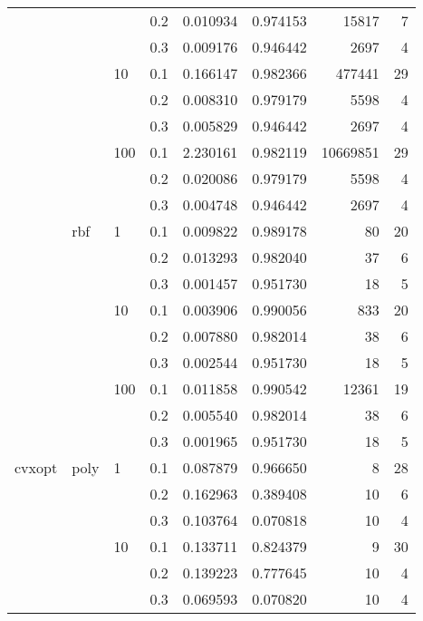 \begin{table}[H]
\begin{tabular}{llllrrrr}
       &     &     & 0.2 &     0.010934 &  0.974153 &     15817 &     7 \\
       &     &     & 0.3 &     0.009176 &  0.946442 &      2697 &     4 \\
       &     & 10  & 0.1 &     0.166147 &  0.982366 &    477441 &    29 \\
       &     &     & 0.2 &     0.008310 &  0.979179 &      5598 &     4 \\
       &     &     & 0.3 &     0.005829 &  0.946442 &      2697 &     4 \\
       &     & 100 & 0.1 &     2.230161 &  0.982119 &  10669851 &    29 \\
       &     &     & 0.2 &     0.020086 &  0.979179 &      5598 &     4 \\
       &     &     & 0.3 &     0.004748 &  0.946442 &      2697 &     4 \\
       & rbf & 1   & 0.1 &     0.009822 &  0.989178 &        80 &    20 \\
       &     &     & 0.2 &     0.013293 &  0.982040 &        37 &     6 \\
       &     &     & 0.3 &     0.001457 &  0.951730 &        18 &     5 \\
       &     & 10  & 0.1 &     0.003906 &  0.990056 &       833 &    20 \\
       &     &     & 0.2 &     0.007880 &  0.982014 &        38 &     6 \\
       &     &     & 0.3 &     0.002544 &  0.951730 &        18 &     5 \\
       &     & 100 & 0.1 &     0.011858 &  0.990542 &     12361 &    19 \\
       &     &     & 0.2 &     0.005540 &  0.982014 &        38 &     6 \\
       &     &     & 0.3 &     0.001965 &  0.951730 &        18 &     5 \\
cvxopt & poly & 1   & 0.1 &     0.087879 &  0.966650 &         8 &    28 \\
       &     &     & 0.2 &     0.162963 &  0.389408 &        10 &     6 \\
       &     &     & 0.3 &     0.103764 &  0.070818 &        10 &     4 \\
       &     & 10  & 0.1 &     0.133711 &  0.824379 &         9 &    30 \\
       &     &     & 0.2 &     0.139223 &  0.777645 &        10 &     4 \\
       &     &     & 0.3 &     0.069593 &  0.070820 &        10 &     4 \\

\end{tabular}
\end{table}
